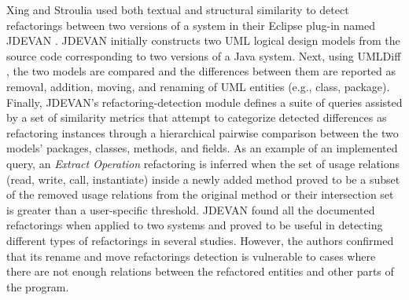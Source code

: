 \documentclass[letterpaper,12pt,onecolumn,final]{report}
\begin{document}
Xing and Stroulia \cite{Xing2006} used both textual and structural similarity to detect refactorings between two versions of a system in their Eclipse plug-in named JDEVAN \cite{Xing2007} \cite{Xing2008}. JDEVAN initially constructs two UML logical design models from the source code corresponding to two versions of a Java system.  Next, using UMLDiff \cite{Xing2005}, the two models are compared and the differences between them are reported as removal, addition, moving, and renaming of UML entities (e.g., class, package). Finally, JDEVAN’s refactoring-detection module defines a suite of queries \cite{Xing2006} assisted by a set of similarity metrics that attempt to categorize detected differences as refactoring instances through a hierarchical pairwise comparison between the two models' packages, classes, methods, and fields. As an example of an implemented query, an \textit{Extract Operation} refactoring is inferred when the set of usage relations (read, write, call, instantiate) inside a newly added method proved to be a subset of the removed usage relations from the original method or their intersection set is greater than a user-specific threshold.  JDEVAN found all the documented refactorings when applied to two systems and proved to be useful in detecting different types of refactorings in several studies. However, the authors confirmed that its rename and move refactorings detection is vulnerable to cases where there are not enough relations between the refactored entities and other parts of the program.
\end{document}
